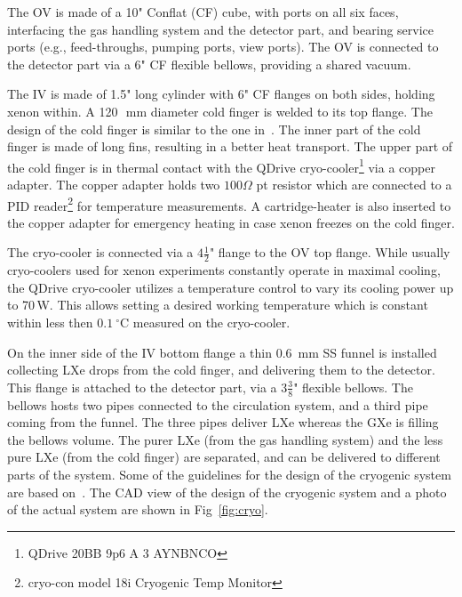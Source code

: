The OV is made of a 10" Conflat (CF) cube, with ports on all six faces, interfacing the gas handling system and  the detector part, and bearing service ports (e.g., feed-throughs, pumping ports, 
view ports). The OV is connected to the detector part via a 6" CF flexible bellows, providing a shared vacuum.

The IV is made of 1.5" long cylinder with 6" CF flanges on both sides, holding xenon within. A 120~\,mm diameter cold finger is welded to its top flange. The design of the cold finger is similar to the one in~\cite{xe100_instr2012}. The inner part of the cold finger is made of long fins, resulting in a better heat transport.  The upper part of the cold finger is in thermal contact with the 
QDrive cryo-cooler\footnote{QDrive 20BB 9p6 A 3 AYNBNCO} via a copper adapter. The copper adapter 
holds two $100\Omega$ pt resistor which are connected to a PID reader\footnote{cryo-con model 
18i Cryogenic Temp Monitor} for temperature measurements. A cartridge-heater 
is also inserted to the copper adapter for emergency heating in case xenon freezes on the 
cold finger. 

The cryo-cooler is connected via a $4\frac{1}{2}$" 
flange to the OV top flange. While usually cryo-coolers used for 
xenon experiments constantly operate in maximal cooling, the QDrive cryo-cooler utilizes a 
temperature control to vary its cooling power up to 70\,W. This allows setting a desired working temperature which is constant within less then $0.1~\mathrm{^{\circ}C}$ measured on the cryo-cooler.

On the inner side of the IV bottom flange a thin 0.6~mm SS funnel is installed 
collecting LXe drops from the cold finger, and delivering them to the  detector. This flange is attached to the detector part, via a $3\frac{3}{8}$" flexible bellows. The 
bellows hosts two pipes connected to the circulation system, and a third pipe coming 
from the funnel. The three pipes deliver LXe whereas the GXe is filling the bellows volume. The purer LXe (from the gas handling system) and the less pure LXe (from the cold finger) are separated, and can be delivered to different parts of the system. Some of the guidelines for the design of 
the cryogenic system are based on~\cite{Giboni}. The CAD view of 
the design of the cryogenic system and a photo of the actual system are shown in Fig~\ref{fig:cryo}. 

